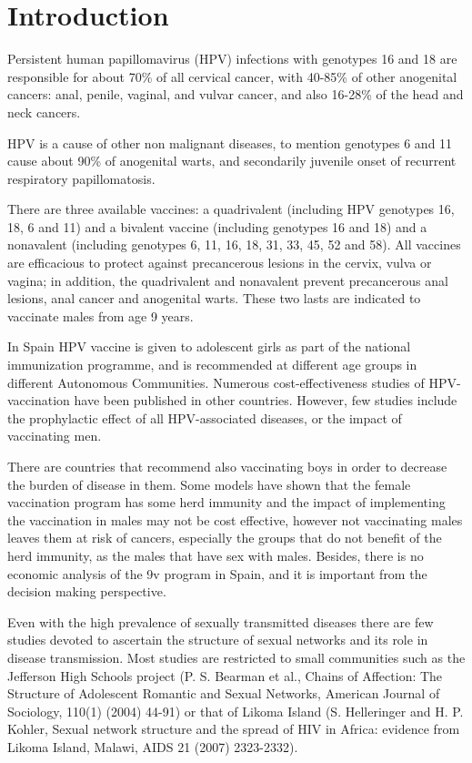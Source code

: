 
\chapter{Introduction}\label{CAPINTRO}

Persistent human papillomavirus (HPV) infections with genotypes 16 and 18 are responsible for about 70\% of all cervical cancer, with 40-85\% of other anogenital cancers: anal, penile, vaginal, and vulvar cancer, and also 16-28\% of the head and neck cancers.

HPV is a cause of other non malignant diseases, to mention genotypes 6 and 11 cause about 90\% of anogenital warts, and secondarily juvenile onset of recurrent respiratory papillomatosis.

There are three available vaccines: a quadrivalent (including HPV genotypes 16, 18, 6 and 11) and a bivalent vaccine (including genotypes 16 and 18) and a nonavalent (including genotypes 6, 11, 16, 18, 31, 33, 45, 52 and 58). All vaccines are efficacious to protect against precancerous lesions in the cervix, vulva or vagina; in addition, the quadrivalent and nonavalent prevent precancerous anal lesions, anal cancer and anogenital warts. These two lasts are indicated to vaccinate males from age 9 years.

In Spain HPV vaccine is given to adolescent girls as part of the national immunization programme, and is recommended at different age groups in different Autonomous Communities. Numerous cost-effectiveness studies of HPV-vaccination have been published in other countries. However, few studies include the prophylactic effect of all HPV-associated diseases, or the impact of vaccinating men.

There are countries that recommend also vaccinating boys in order to decrease the burden of disease in them. Some models have shown that the female vaccination program has some herd immunity and the impact of implementing the vaccination in males may not be cost effective, however not vaccinating males leaves them at risk of cancers, especially the groups that do not benefit of the herd immunity, as the males that have sex with males.
Besides, there is no economic analysis of the 9v program in Spain, and it is important from the decision making perspective.

Even with the high prevalence of sexually transmitted diseases there are few studies devoted to ascertain the structure of sexual networks and its role in disease transmission. Most studies are restricted to small communities such as the Jefferson High Schools project (P. S. Bearman et al., Chains of Affection: The Structure of Adolescent Romantic and Sexual Networks, American Journal of Sociology, 110(1) (2004) 44-91) or that of Likoma Island (S. Helleringer and H. P. Kohler, Sexual network structure and the spread of HIV in Africa: evidence from Likoma Island, Malawi, AIDS 21 (2007) 2323-2332).

